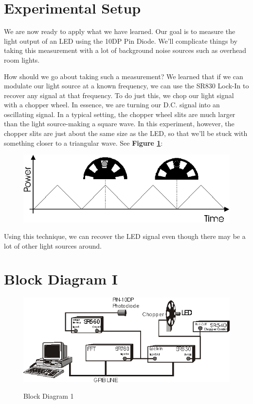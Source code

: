 \documentclass{../lab}
\begin{document}
\section{Experimental Setup}

We are now ready to apply what we have learned. Our goal is to measure the light output of an LED using the 10DP Pin Diode. We'll complicate things by taking this measurement with a lot of background noise sources such as overhead room lights.

How should we go about taking such a measurement? We learned that if we can modulate our light source at a known frequency, we can use the SR830 Lock-In to recover any signal at that frequency. To do just this, we chop our light signal with a chopper wheel. In essence, we are turning our D.C. signal into an oscillating signal. In a typical setting, the chopper wheel slits are much larger than the light source-making a square wave. In this experiment, however, the chopper slits are just about the same size as the LED, so that we'll be stuck with something closer to a triangular wave. See \textbf{Figure \ref{fig:PowerVsTime}}:

\begin{figure}[h]
    \centering
    \href{http://experimentationlab.berkeley.edu/sites/default/files/images/LLSimage044.gif}{\includegraphics[width=0.5\linewidth]{images/LLSimage044.png}}
    \caption{}
    \label{fig:PowerVsTime}
\end{figure}

\noindent Using this technique, we can recover the LED signal even though there may be a lot of other light sources around.

\section{Block Diagram I}

\begin{figure}[h]
    \centering
    \href{http://experimentationlab.berkeley.edu/sites/default/files/images/LLSimage045.gif}{\includegraphics[width=0.5\linewidth]{images/LLSimage045.png}}
    \caption{Block Diagram 1}
    \label{fig:BlockDiagramI}
\end{figure}
\end{document}
